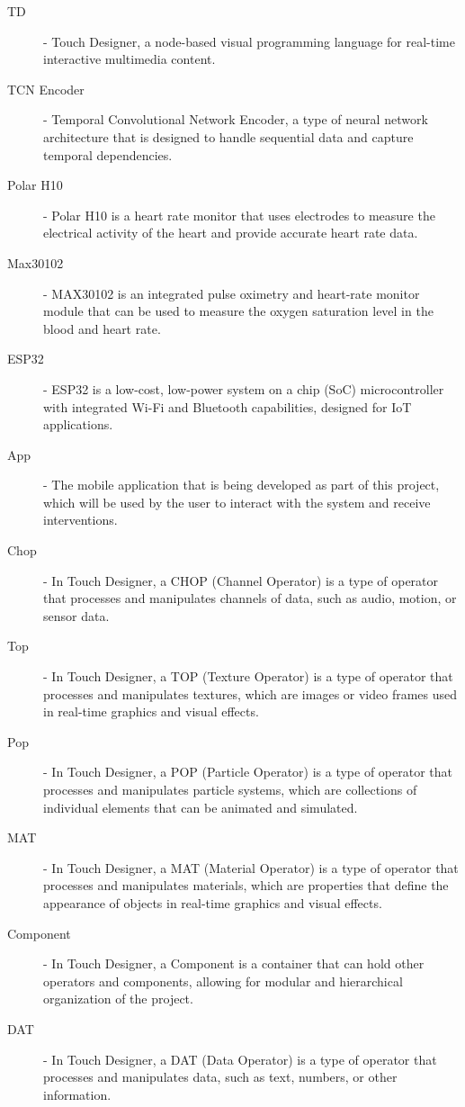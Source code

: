 \documentclass[
	fontsize=15pt,
	twoside=false,
	secnumdepth=2
]{kaobook}
\begin{document}
\begin{description}
  \item[TD] - Touch Designer, a node-based visual programming language for real-time interactive multimedia content.
  \item[TCN Encoder] - Temporal Convolutional Network Encoder, a type of neural network architecture that is designed to handle sequential data and capture temporal dependencies.
  \item[Polar H10] - Polar H10 is a heart rate monitor that uses electrodes to measure the electrical activity of the heart and provide accurate heart rate data.
  \item[Max30102] - MAX30102 is an integrated pulse oximetry and heart-rate monitor module that can be used to measure the oxygen saturation level in the blood and heart rate.
  \item[ESP32] - ESP32 is a low-cost, low-power system on a chip (SoC) microcontroller with integrated Wi-Fi and Bluetooth capabilities, designed for IoT applications.
  \item[App] - The mobile application that is being developed as part of this project, which will be used by the user to interact with the system and receive interventions.
  \item[Chop] - In Touch Designer, a CHOP (Channel Operator) is a type of operator that processes and manipulates channels of data, such as audio, motion, or sensor data.
  \item[Top] - In Touch Designer, a TOP (Texture Operator) is a type of operator that processes and manipulates textures, which are images or video frames used in real-time graphics and visual effects.
  \item[Pop] - In Touch Designer, a POP (Particle Operator) is a type of operator that processes and manipulates particle systems, which are collections of individual elements that can be animated and simulated.
  \item[MAT] - In Touch Designer, a MAT (Material Operator) is a type of operator that processes and manipulates materials, which are properties that define the appearance of objects in real-time graphics and visual effects.
  \item[Component] - In Touch Designer, a Component is a container that can hold other operators and components, allowing for modular and hierarchical organization of the project.
  \item[DAT] - In Touch Designer, a DAT (Data Operator) is a type of operator that processes and manipulates data, such as text, numbers, or other information.

\end{description}
\end{document}
